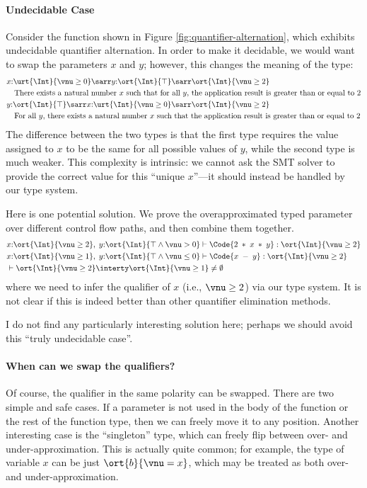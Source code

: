 \paragraph{Undecidable Case} Consider the function shown in Figure \ref{fig:quantifier-alternation}, which exhibits undecidable quantifier alternation. In order to make it decidable, we would want to swap the parameters $x$ and $y$; however, this changes the meaning of the type:
\begin{align*}
    &x{:}\urt{\Int}{\vnu \geq 0} \sarr y{:}\ort{\Int}{\top} \sarr \ort{\Int}{\vnu \geq 2}
    \\&\quad \text{There exists a natural number $x$ such that for all $y$, the application result is greater than or equal to $2$}
    \\&y{:}\ort{\Int}{\top} \sarr x{:}\urt{\Int}{\vnu \geq 0} \sarr \ort{\Int}{\vnu \geq 2}
    \\&\quad \text{For all $y$, there exists a natural number $x$ such that the application result is greater than or equal to $2$}
\end{align*}\noindent
The difference between the two types is that the first type requires the value assigned to $x$ to be the same for all possible values of $y$, while the second type is much weaker. This complexity is intrinsic: we cannot ask the SMT solver to provide the correct value for this ``unique $x$''—it should instead be handled by our type system.

Here is one potential solution. We prove the overapproximated typed parameter over different control flow paths, and then combine them together.
\begin{align*}
    &x{:}\ort{\Int}{\vnu \geq 2},\; y{:}\ort{\Int}{\top \land \vnu > 0} \vdash \Code{2\;*\; x\; *\; y} : \ort{\Int}{\vnu \geq 2}
    \\&x{:}\ort{\Int}{\vnu \geq 1},\; y{:}\ort{\Int}{\top \land \vnu \leq 0} \vdash \Code{x\; -\; y} : \ort{\Int}{\vnu \geq 2}
    \\& \vdash \ort{\Int}{\vnu \geq 2} \interty \ort{\Int}{\vnu \geq 1} \neq \emptyset
\end{align*}\noindent
where we need to infer the qualifier of $x$ (i.e., $\vnu \geq 2$) via our type system. It is not clear if this is indeed better than other quantifier elimination methods.

I do not find any particularly interesting solution here; perhaps we should avoid this ``truly undecidable case''.

\paragraph{When can we swap the qualifiers?} Of course, the qualifier in the same polarity can be swapped.
There are two simple and safe cases. If a parameter is not used in the body of the function or the rest of the function type, then we can freely move it to any position. Another interesting case is the ``singleton'' type, which can freely flip between over- and under-approximation. This is actually quite common; for example, the type of variable $x$ can be just $\ort{b}{\vnu = x}$, which may be treated as both over- and under-approximation.

